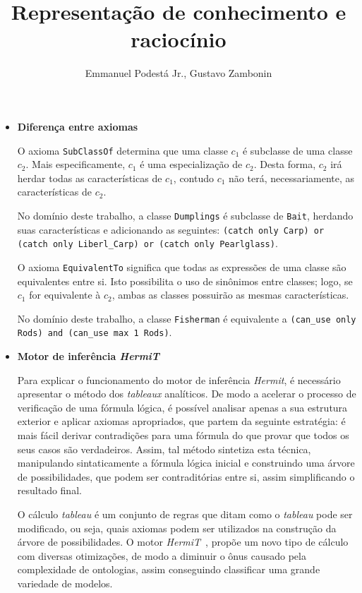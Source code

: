 \documentclass{../../sftex/sftex}
\title{Representação de conhecimento e raciocínio}
\author{Emmanuel Podestá Jr., Gustavo Zambonin}
\begin{document}
\maketitle

\begin{itemize}

    \item \textbf{Diferença entre axiomas}

        O axioma \texttt{SubClassOf} determina que uma classe $c_1$ é
        subclasse de uma classe $c_2$. Mais especificamente, $c_1$ é uma
        especialização de $c_2$. Desta forma, $c_2$ irá herdar todas as
        características de $c_1$, contudo $c_1$ não terá, necessariamente, as
        características de $c_2$.

        No domínio deste trabalho, a classe \texttt{Dumplings} é subclasse
        de \texttt{Bait}, herdando suas características e adicionando as
        seguintes: \texttt{(catch only Carp) or (catch only Liberl\_Carp) or
        (catch only Pearlglass)}.

        O axioma \texttt{EquivalentTo} significa que todas as expressões de
        uma classe são equivalentes entre si. Isto possibilita o uso de
        sinônimos entre classes; logo, se $c_1$ for equivalente à $c_2$, ambas
        as classes possuirão as mesmas características.

        No domínio deste trabalho, a classe \texttt{Fisherman} é equivalente
        a \texttt{(can\_use only Rods) and (can\_use max 1 Rods)}.

    \item \textbf{Motor de inferência \emph{HermiT}}

        Para explicar o funcionamento do motor de inferência \emph{Hermit}, é
        necessário apresentar o método dos \emph{tableaux} analíticos. De modo
        a acelerar o processo de verificação de uma fórmula lógica, é possível
        analisar apenas a sua estrutura exterior e aplicar axiomas
        apropriados, que partem da seguinte estratégia: é mais fácil derivar
        contradições para uma fórmula do que provar que todos os seus casos
        são verdadeiros. Assim, tal método sintetiza esta técnica, manipulando
        sintaticamente a fórmula lógica inicial e construindo uma árvore de
        possibilidades, que podem ser contraditórias entre si, assim
        simplificando o resultado final.~\cite{Constable:2012}

        O cálculo \emph{tableau} é um conjunto de regras que ditam como o
        \emph{tableau} pode ser modificado, ou seja, quais axiomas podem ser
        utilizados na construção da árvore de possibilidades. O motor
        \emph{HermiT}~\cite{smh08HermiT}, propõe um novo tipo de cálculo com
        diversas otimizações, de modo a diminuir o ônus causado pela
        complexidade de ontologias, assim conseguindo classificar uma grande
        variedade de modelos.


\end{itemize}
\end{document}
